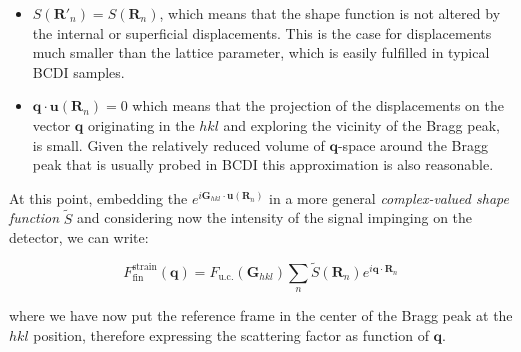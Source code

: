 \begin{itemize}
    \item $ S(\mathbf{R}'_n) = S(\mathbf{R}_n)$, which means that the shape function is not altered by the internal or superficial 
    displacements. This is the case for displacements much smaller than the lattice parameter, which is easily fulfilled in 
    typical BCDI samples. 
    \item $\mathbf{q}\cdot\mathbf{u}(\mathbf{R}_n) = 0 $ which means that the projection of the displacements on the vector 
    $\mathbf{q}$ originating in the $hkl$ and exploring the vicinity of the Bragg peak, is small. Given the relatively 
    reduced volume of $\mathbf{q}$-space around the Bragg peak that is usually probed in BCDI this approximation is 
    also reasonable. 
\end{itemize}

At this point, embedding the $e^{i \mathbf{G}_{hkl} \cdot  \mathbf{u}(\mathbf{R}_n) }$ in a more general \textit{complex-valued 
shape function} $\tilde{S}$ and considering now the intensity of the signal impinging on the detector, we can write: 

\begin{equation}
    F^{\text{strain}}_{\text{fin}}(\mathbf{q}) = F_{\text{u.c.}}(\mathbf{G}_{hkl}) \sum_{n} \tilde{S}(\mathbf{R}_n) e^{i \mathbf{q} \cdot  \mathbf{R}_n }
    \label{eq:strain_fin4}
\end{equation}

where we have now put the reference frame in the center of the Bragg peak at the $hkl$ position, therefore expressing 
the scattering factor as function of $\mathbf{q}$.




